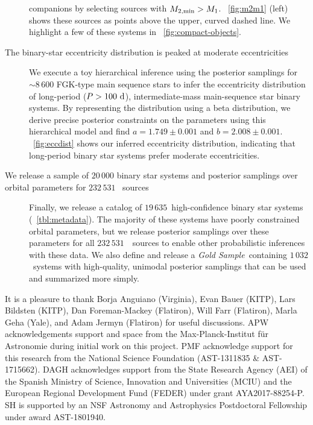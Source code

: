 \documentclass[modern]{aastex63}
\newcommand{\nsources}{\ensuremath{232\,531}}
\newcommand{\nbinary}{\ensuremath{19\,635}}
\newcommand{\goldsample}{\textit{Gold Sample}}
\newcommand{\ngold}{\ensuremath{1\,032}}
\begin{document}
\begin{description}
    companions by selecting sources with $M_{2, {\rm min}} > M_1$.
    \figurename~\ref{fig:m2m1} (left) shows these sources as points above the
    upper, curved dashed line. We highlight a few of these systems in
    \figurename~\ref{fig:compact-objects}.
    \item[The binary-star eccentricity distribution is peaked at
    moderate eccentricities] We execute a toy hierarchical inference using the
    posterior samplings for $\sim 8\,600$ FGK-type main sequence stars to infer
    the eccentricity distribution of long-period ($P>100~\mathrm{d}$),
    intermediate-mass main-sequence star binary systems. By representing the
    distribution using a beta distribution, we derive precise posterior
    constraints on the parameters using this hierarchical model and find $a =
    1.749 \pm 0.001$ and $b = 2.008 \pm 0.001$. \figurename~\ref{fig:eccdist}
    shows our inferred eccentricity distribution, indicating that long-period
    binary star systems prefer moderate eccentricities.
    \item[We release a sample of $20\,000$ binary star systems and posterior
    samplings over orbital parameters for $\nsources$ \apogee\ sources] Finally,
    we release a catalog of \nbinary\ high-confidence binary star systems
    (\tablename~\ref{tbl:metadata}). The majority of these systems have poorly
    constrained orbital parameters, but we release posterior samplings over
    these parameters for all \nsources\ \apogee\ sources to enable other
    probabilistic inferences with these data. We also define and release a
    \goldsample\ containing \ngold\ systems with high-quality, unimodal
    posterior samplings that can be used and summarized more simply.
\end{description}


\acknowledgements

It is a pleasure to thank
Borja Anguiano (Virginia),
Evan Bauer (KITP),
Lars Bildsten (KITP),
Dan Foreman-Mackey (Flatiron),
Will Farr (Flatiron),
Marla Geha (Yale),
and Adam Jermyn (Flatiron) for useful discussions.
APW acknowledgements support and space from the Max-Planck-Institut f\"ur
Astronomie during initial work on this project.
PMF acknowledge support for this research from the National Science Foundation
(AST-1311835 \& AST-1715662).
DAGH acknowledges support from the State Research Agency (AEI) of the Spanish
Ministry of Science, Innovation and Universities (MCIU) and the European
Regional Development Fund (FEDER) under grant AYA2017-88254-P.
SH is supported by an NSF Astronomy and Astrophysics Postdoctoral Fellowship
under award AST-1801940.
\end{document}
